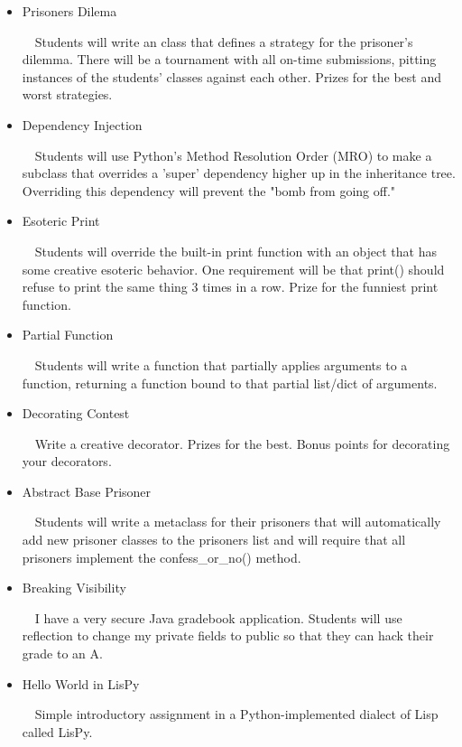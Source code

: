 \documentclass[11pt]{article}
\begin{document}
\begin{itemize} 

\item Prisoners Dilema 

$\ \ \ $ Students will write an class that defines a strategy for the prisoner's dilemma. There will be a tournament with all on-time submissions, pitting instances of the students' classes against each other. Prizes for the best and worst strategies.

\item Dependency Injection 

$\ \ \ $ Students will use Python's Method Resolution Order (MRO) to make a subclass that overrides a 'super' dependency higher up in the inheritance tree. Overriding this dependency will prevent the "bomb from going off."

\item Esoteric Print 

$\ \ \ $ Students will override the built-in print function with an object that has some creative esoteric behavior. One requirement will be that print() should refuse to print the same thing 3 times in a row. Prize for the funniest print function.

\item Partial Function

$\ \ \ $ Students will write a function that partially applies arguments to a function, returning a function bound to that partial list/dict of arguments.

\item Decorating Contest

$\ \ \ $ Write a creative decorator. Prizes for the best. Bonus points for decorating your decorators.

\item Abstract Base Prisoner

$\ \ \ $ Students will write a metaclass for their prisoners that will automatically add new prisoner classes to the prisoners list and will require that all prisoners implement the confess\_or\_no() method.

\item Breaking Visibility 

$\ \ \ $ I have a very secure Java gradebook application. Students will use reflection to change my private fields to public so that they can hack their grade to an A.

\item Hello World in LisPy

$\ \ \ $ Simple introductory assignment in a Python-implemented dialect of Lisp called LisPy.


\end{itemize}
\end{document}
